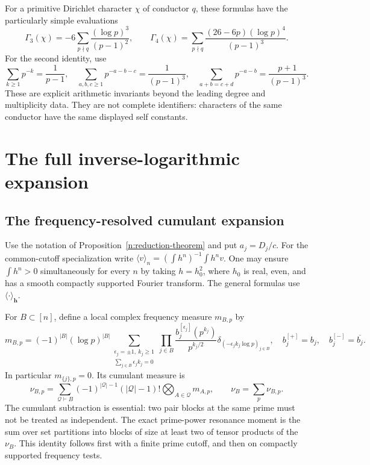 \documentclass[11pt]{article}
\numberwithin{equation}{section}
\theoremstyle{remark}
\begin{document}
For a primitive Dirichlet character $\chi$ of conductor $q$, these formulas
have the particularly simple evaluations
\[
 \Gamma_3(\chi)=-6\sum_{p\nmid q}\frac{(\log p)^3}{(p-1)^2},
 \qquad
 \Gamma_4(\chi)=\sum_{p\nmid q}
       \frac{(26-6p)(\log p)^4}{(p-1)^3}.
\]
For the second identity, use
\[
 \sum_{k\ge1}p^{-k}=\frac1{p-1},\quad
 \sum_{a,b,c\ge1}p^{-a-b-c}=\frac1{(p-1)^3},\quad
 \sum_{a+b=c+d}p^{-a-b}=\frac{p+1}{(p-1)^3}.
\]
These are explicit arithmetic invariants beyond the leading degree and
multiplicity data.  They are not complete identifiers: characters of the
same conductor have the same displayed self constants.


\section{The full inverse-logarithmic expansion}
\subsection{The frequency-resolved cumulant expansion}
Use the notation of Proposition~\ref{n:reduction-theorem} and put
$a_j=D_j/c$. For the common-cutoff specialization write
$\langle v\rangle_n=(\int h^n)^{-1}\int h^n v$. One may ensure
$\int h^n>0$ simultaneously for every $n$ by taking $h=h_0^2$, where
$h_0$ is real, even, and has a smooth compactly supported Fourier transform.
The general formulas use $\langle\cdot\rangle_{\boldsymbol h}$.

For $B\subset[n]$, define a local complex frequency measure $m_{B,p}$ by
\[
 m_{B,p}=(-1)^{|B|}(\log p)^{|B|}
 \sum_{\substack{\epsilon_j=\pm1,\ k_j\ge1\\\sum_{j\in B}\epsilon_jk_j=0}}
 \prod_{j\in B}\frac{b_j^{[\epsilon_j]}(p^{k_j})}{p^{k_j/2}}
 \delta_{(-\epsilon_jk_j\log p)_{j\in B}},
 \quad b_j^{[+]}=b_j,\quad b_j^{[-]}=\overline{b_j}.
\]
In particular $m_{\{j\},p}=0$. Its cumulant measure is
\[
 \nu_{B,p}=\sum_{\mathcal Q\vdash B}
 (-1)^{|\mathcal Q|-1}(|\mathcal Q|-1)!
 \bigotimes_{A\in\mathcal Q}m_{A,p},\qquad \nu_B=\sum_p\nu_{B,p}.
\]
The cumulant subtraction is essential: two pair blocks at the same prime
must not be treated as independent. The exact prime-power resonance
moment is the sum over set partitions into blocks of size at least two
of tensor products of the $\nu_B$. This identity follows first with a
finite prime cutoff, and then on compactly supported frequency tests.
\end{document}

